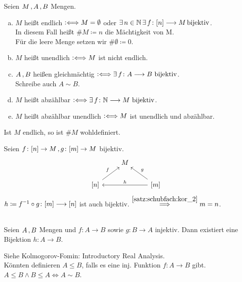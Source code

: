 \documentclass[../ana1.tex]{subfiles}
\begin{document}
\begin{defi}
	Seien \(M \operatorname{,} A \operatorname{,} B \) Mengen.
	\begin{enumerate}[(a)]
		\item \(M \) heißt endlich \(\mathrel{\vcentcolon\Longleftrightarrow} M = \emptyset \) oder \(\exists \, n \in \mathbb{N} \, \exists \, f \colon [n] \longrightarrow M \operatorname{bijektiv} \). \\
			  In diesem Fall heißt \(\#M \coloneqq n \) die Mächtigkeit von M. \\
			  Für die leere Menge setzen wir \(\#\emptyset \coloneqq 0 \). \\
		\item \(M \) heißt unendlich \(\mathrel{\vcentcolon\Longleftrightarrow} M \) ist nicht endlich.
		\item \(A \operatorname{,} B \) heißen gleichmächtig \(\mathrel{\vcentcolon\Longleftrightarrow} \exists \, f \colon A \longrightarrow B \, \operatorname{bijektiv} \). \\
			  Schreibe auch \(A \sim B\).
		\item \(M \) heißt abzählbar \(\mathrel{\vcentcolon\Longleftrightarrow} \exists \, f \colon \mathbb{N} \longrightarrow M \, \operatorname{bijektiv} \).
		\item \(M \) heißt abzählbar unendlich \(\mathrel{\vcentcolon\Longleftrightarrow} M \) ist unendlich und abzählbar.
	\end{enumerate}
\end{defi}

\begin{bem}
	Ist \(M \) endlich, so ist \(\#M \) wohldefiniert.
\end{bem}
\begin{bew}
	Seien \(f \colon [n] \rightarrow M \operatorname{,} g \colon [m] \rightarrow M \) bijektiv.
	\[\begin{tikzcd}
		& M &  \\
	   {[n]} \arrow[ru, "f"] &  & {[m]} \arrow[lu, "g"'] \arrow[ll, "h"']
	\end{tikzcd}\]
	\( h \coloneqq \inverse{f} \circ g \colon [m] \longrightarrow [n] \) ist auch bijektiv. \(\overset{\autoref{satz:schubfach:kor_2}}{\implies} m=n \).
\end{bew}

\begin{bem}\label{satz:cantor_Berenstein}\leavevmode \\
	Seien \(A \operatorname{,} B \) Mengen und \(f \colon A \longrightarrow B \) sowie \(g \colon B \longrightarrow A \) injektiv.
	Dann existiert eine Bijektion \(h \colon A \longrightarrow B \).
\end{bem}
\begin{bew}
	Siehe Kolmogorov-Fomin: Introductory Real Analysis. \\
	Könnten definieren \(A\leq B \), falls es eine inj. Funktion \(f: A\rightarrow B \) gibt. \\
	\(A\leq B \wedge B\leq A \Leftrightarrow A\sim B \).
\end{bew}
\end{document}
